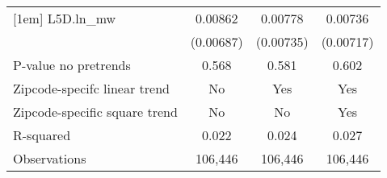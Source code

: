 {\begin{tabular}{l*{3}{c}}
[1em]
L5D.ln\_mw &  0.00862         &  0.00778         &  0.00736         \\
          &(0.00687)         &(0.00735)         &(0.00717)         \\
\hline
P-value no pretrends&    0.568         &    0.581         &    0.602         \\
Zipcode-specifc linear trend&       No         &      Yes         &      Yes         \\
Zipcode-specific square trend&       No         &       No         &      Yes         \\
R-squared &    0.022         &    0.024         &    0.027         \\
Observations&  106,446         &  106,446         &  106,446         \\
\hline\hline
\end{tabular}
}
